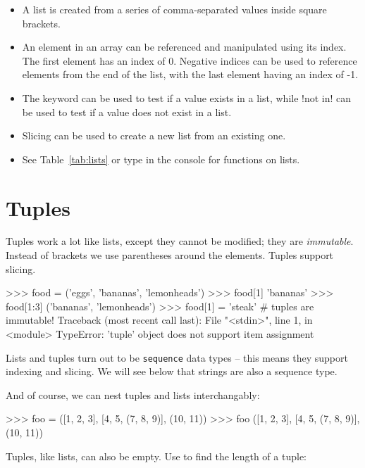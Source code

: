 \documentclass[11pt]{cselabheader}
\begin{document}
\begin{itemize}
  \item A list is created from a series of comma-separated values inside square
    brackets.
  \item An element in an array can be referenced and manipulated
    using its index. The first element has an index of 0. Negative indices can
    be used to reference elements from the end of the list, with the last
    element having an index of -1.
  \item The  keyword can be used to test if a value exists in a
    list, while \pythoninline!not in! can be used to test if a value does not exist
    in a list.
  \item Slicing can be used to create a new list from an existing one.
  \item See Table~\ref{tab:lists} or type  in the
      console for functions on lists.
\end{itemize}

\pagebreak
\section{Tuples}

Tuples work a lot like lists, except they cannot be modified; they are
\emph{immutable}. Instead of brackets \pythoninline{[]} we use parentheses
\pythoninline{()} around the elements. Tuples support slicing.

\begin{pyconcode}
>>> food = ('eggs', 'bananas', 'lemonheads')
>>> food[1]
'bananas'
>>> food[1:3]
('bananas', 'lemonheads')
>>> food[1] = 'steak' # tuples are immutable!
Traceback (most recent call last):
  File "<stdin>", line 1, in <module>
TypeError: 'tuple' object does not support item assignment
\end{pyconcode}

Lists and tuples turn out to be \texttt{sequence} data types -- this means they
support indexing and slicing. We will see below that strings are also a sequence
type.

And of course, we can nest tuples and lists interchangably:

\begin{pyconcode}
>>> foo = ([1, 2, 3], [4, 5, (7, 8, 9)], (10, 11))
>>> foo
([1, 2, 3], [4, 5, (7, 8, 9)], (10, 11))
\end{pyconcode}

Tuples, like lists, can also be empty. Use  to find the
length of a tuple:
\end{document}
